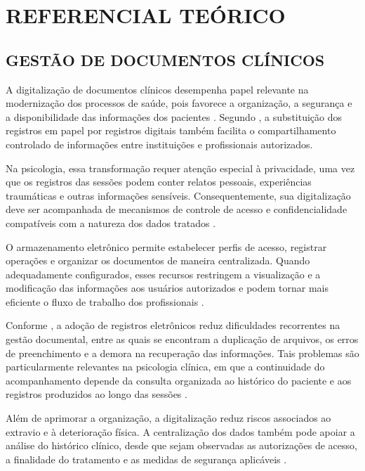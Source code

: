 \chapter{REFERENCIAL TEÓRICO}

\section{GESTÃO DE DOCUMENTOS CLÍNICOS}

A digitalização de documentos clínicos desempenha papel relevante na modernização dos processos de saúde, pois favorece a organização, a segurança e a disponibilidade das informações dos pacientes \cite{pereira2024toward}. Segundo , a substituição dos registros em papel por registros digitais também facilita o compartilhamento controlado de informações entre instituições e profissionais autorizados.

Na psicologia, essa transformação requer atenção especial à privacidade, uma vez que os registros das sessões podem conter relatos pessoais, experiências traumáticas e outras informações sensíveis. Consequentemente, sua digitalização deve ser acompanhada de mecanismos de controle de acesso e confidencialidade compatíveis com a natureza dos dados tratados \cite{salles2023privacidade}.

O armazenamento eletrônico permite estabelecer perfis de acesso, registrar operações e organizar os documentos de maneira centralizada. Quando adequadamente configurados, esses recursos restringem a visualização e a modificação das informações aos usuários autorizados e podem tornar mais eficiente o fluxo de trabalho dos profissionais \cite{moerschberger2017reflexoes}.

Conforme , a adoção de registros eletrônicos reduz dificuldades recorrentes na gestão documental, entre as quais se encontram a duplicação de arquivos, os erros de preenchimento e a demora na recuperação das informações. Tais problemas são particularmente relevantes na psicologia clínica, em que a continuidade do acompanhamento depende da consulta organizada ao histórico do paciente e aos registros produzidos ao longo das sessões \cite{opsi2025}.

Além de aprimorar a organização, a digitalização reduz riscos associados ao extravio e à deterioração física. A centralização dos dados também pode apoiar a análise do histórico clínico, desde que sejam observadas as autorizações de acesso, a finalidade do tratamento e as medidas de segurança aplicáveis \cite{hage2023plataforma}.

